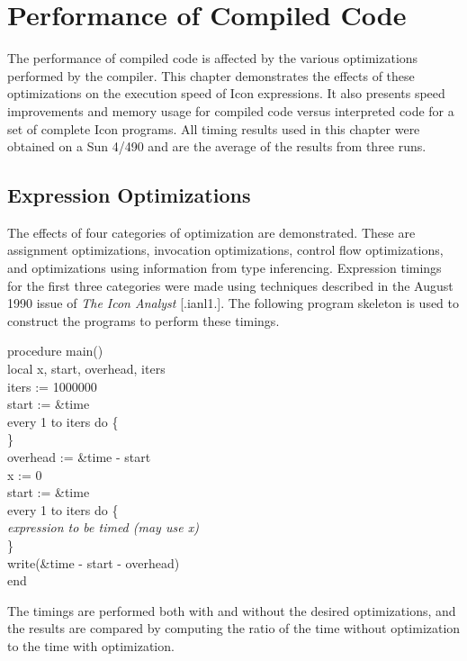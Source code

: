 \chapter{Performance of Compiled Code}

The performance of compiled code is affected by the various
optimizations performed by the compiler. This chapter demonstrates the
effects of these optimizations on the execution speed of Icon
expressions. It also presents speed improvements and memory usage for
compiled code versus interpreted code for a set of complete Icon
programs. All timing results used in this chapter were obtained on a
Sun 4/490 and are the average of the results from three runs.


\section{Expression Optimizations}

The effects of four categories of optimization are demonstrated. These
are assignment optimizations, invocation optimizations, control flow
optimizations, and optimizations using information from type
inferencing. Expression timings for the first three categories were
made using techniques described in the August 1990 issue of
\textit{The Icon Analyst} [.ianl1.]. The following program skeleton is
used to construct the programs to perform these timings.

\goodbreak
\begin{iconcode}
\>procedure main()\\
\>\>local x, start, overhead, iters\\
\>\>iters := 1000000\\
\>\>start := \&time\\
\>\>every 1 to iters do \{\\
\>\>\>\}\\
\>\>overhead := \&time - start\\
\>\>x := 0\\
\>\>start := \&time\\
\>\>every 1 to iters do \{\\
\>\>\>\textit{expression to be timed (may use x)}\\
\>\>\>\}\\
\>\>write(\&time - start - overhead)\\
\>end\\
\end{iconcode}

The timings are performed both with and without the desired
optimizations, and the results are compared by computing the ratio of
the time without optimization to the time with optimization.

